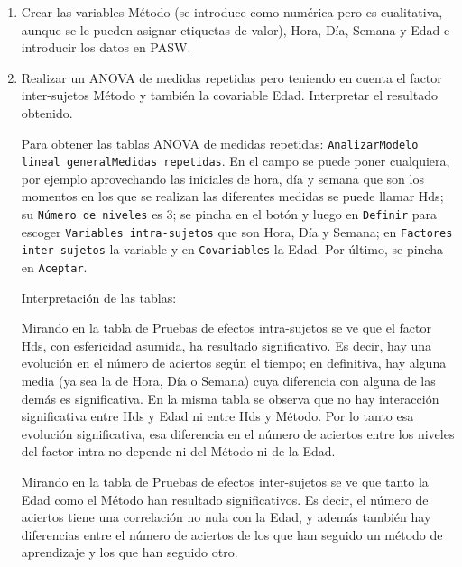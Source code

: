 \begin{enumerate}
\begin{enumerate}

\item Crear las variables Método (se introduce como numérica pero es cualitativa, aunque se le pueden asignar etiquetas de valor), Hora, Día, Semana y Edad e introducir los datos en PASW.



\item Realizar un ANOVA de medidas repetidas pero teniendo en cuenta el factor inter-sujetos Método y también la covariable Edad. Interpretar el resultado obtenido.

\begin{indicacion}{Para obtener las tablas ANOVA de medidas repetidas: \texttt{Analizar\flecha Modelo lineal general\flecha Medidas repetidas}. En el campo  se puede poner cualquiera, por ejemplo aprovechando las iniciales de hora, día y semana que son los momentos en los que se realizan las diferentes medidas se puede llamar \textsf{Hds}; su \texttt{Número de niveles} es 3; se pincha en el botón  y luego en \texttt{Definir} para escoger \texttt{Variables intra-sujetos} que son \textsf{Hora}, \textsf{Día} y \textsf{Semana}; en \texttt{Factores inter-sujetos} la variable  y en \texttt{Covariables} la \textsf{Edad}. Por último, se pincha en \texttt{Aceptar}.


Interpretación de las tablas:

Mirando en la tabla de Pruebas de efectos intra-sujetos se ve que el factor Hds, con esfericidad asumida, ha resultado significativo. Es decir, hay una evolución en el número de aciertos según el tiempo; en definitiva, hay alguna media (ya sea la de Hora, Día o Semana) cuya diferencia con alguna de las demás es significativa. En la misma tabla se observa que no hay interacción significativa entre Hds y Edad ni entre Hds y Método. Por lo tanto esa evolución significativa, esa diferencia en el número de aciertos entre los niveles del factor intra no depende ni del Método ni de la Edad.

Mirando en la tabla de Pruebas de efectos inter-sujetos se ve que tanto la Edad como el Método han resultado significativos. Es decir, el número de aciertos tiene una correlación no nula con la Edad, y además también hay diferencias entre el número de aciertos de los que han seguido un método de aprendizaje y los que han seguido otro.


}
\end{indicacion}


\end{enumerate}
\end{enumerate}
